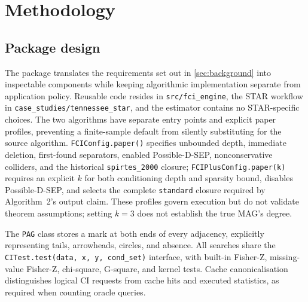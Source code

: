 \documentclass[11pt,a4paper]{article}
\theoremstyle{definition}
\newcommand{\code}[1]{\texttt{#1}}
\begin{document}
\section{Methodology}
\label{sec:method}

\subsection{Package design}

The package translates the requirements set out in \cref{sec:background}
into inspectable components while keeping algorithmic implementation separate
from application policy. Reusable code resides in \code{src/fci\_engine},
the STAR workflow in \code{case\_studies/tennessee\_star}, and the estimator
contains no STAR-specific choices. The two algorithms have separate entry
points and explicit paper profiles, preventing a finite-sample default from
silently substituting for the source algorithm. \code{FCIConfig.paper()}
specifies unbounded depth, immediate
deletion, first-found separators, enabled Possible-D-SEP, nonconservative
colliders, and the historical \code{spirtes\_2000} closure;
\code{FCIPlusConfig.paper(k)} requires an explicit \(k\) for both
conditioning depth and sparsity bound, disables Possible-D-SEP, and selects
the complete \code{standard} closure required by Algorithm~2's output claim.
These profiles govern execution but do not validate theorem assumptions;
setting \(k=3\) does not establish the true MAG's degree.

The \code{PAG} class stores a mark at both ends of every adjacency, explicitly
representing tails, arrowheads, circles, and absence. All searches share the
\code{CITest.test(data, x, y, cond\_set)} interface, with built-in Fisher-Z,
missing-value Fisher-Z, chi-square, G-square, and kernel tests. Cache
canonicalisation distinguishes logical CI requests from cache hits and
executed statistics, as required when counting oracle queries.
\end{document}

